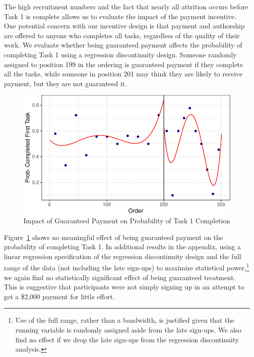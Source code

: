 \documentclass[
  letterpaper,
  DIV=11,
  numbers=noendperiod]{scrartcl}
\begin{document}
The high recruitment numbers and the fact that nearly all attrition
occurs before Task 1 is complete allows us to evaluate the impact of the
payment incentive. One potential concern with our incentive design is
that payment and authorship are offered to anyone who completes all
tasks, regardless of the quality of their work. We evaluate whether
being guaranteed payment affects the probability of completing Task 1
using a regression discontinuity design. Someone randomly assigned to
position 199 in the ordering is guaranteed payment if they complete all
the tasks, while someone in position 201 may think they are likely to
receive payment, but they are not guaranteed it.

\begin{figure}

{\centering \includegraphics{The-Sources-of-Researcher-Variation-in-Economics_files/figure-pdf/fig-rdd-1.pdf}

}

\caption{\label{fig-rdd}Impact of Guaranteed Payment on Probability of
Task 1 Completion}

\end{figure}

Figure~\ref{fig-rdd} shows no meaningful effect of being guaranteed
payment on the probability of completing Task 1. In additional results
in the appendix, using a linear regression specification of the
regression discontinuity design and the full range of the data (not
including the late sign-ups) to maximize statistical power,\footnote{Use
  of the full range, rather than a bandwidth, is justified given that
  the running variable is randomly assigned aside from the late
  sign-ups. We also find no effect if we drop the late sign-ups from the
  regression discontinuity analysis.} we again find no statistically
significant effect of being guaranteed treatment. This is suggestive
that participants were not simply signing up in an attempt to get a
\$2,000 payment for little effort.
\end{document}
